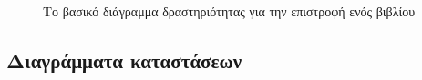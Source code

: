 \documentclass{assignment}
\begin{document}
\begin{figure}
\begin{center}
\caption{Το βασικό διάγραμμα δραστηριότητας για την επιστροφή ενός βιβλίου} 
\label{fig:activity_diagram_return_book_basic}
\end{center}
\end{figure}








\subsection{Διαγράμματα καταστάσεων}
\end{document}
